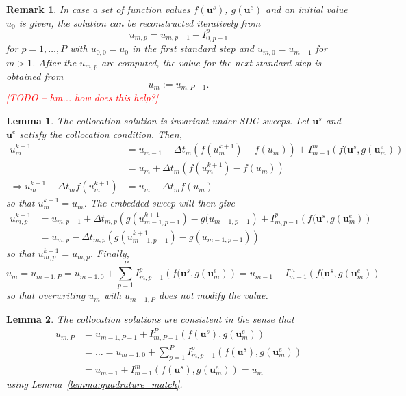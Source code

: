 \documentclass{article}
\newtheorem{remark}{Remark}
\newtheorem{lemma}{Lemma}
\newcommand{\ve}[1]{\mathbf{#1}}
\newcommand{\todo}[1]{\textcolor{red}{[TODO -- #1]}}
\begin{document}
%
%
%
\begin{remark}
In case a set of function values $f(\ve{u}^{s})$, $g(\ve{u}^e)$ and an initial value $u_0$ is given, the solution can be reconstructed iteratively from
\begin{equation}
	u_{m,p} = u_{m,p-1} + I_{0,p-1}^{p}
\end{equation}
for $p=1, \ldots, P$ with $u_{0,0} = u_0$ in the first standard step and $u_{m,0} = u_{m-1}$ for $m > 1$.
After the $u_{m,p}$ are computed, the value for the next standard step is obtained from
\begin{equation}
	u_{m} := u_{m,P-1}.
\end{equation}
\todo{hm... how does this help?}
\end{remark}
%
%
%
\begin{lemma}
The collocation solution is invariant under SDC sweeps. Let $\ve{u}^s$ and $\ve{u}^e$ satisfy the collocation condition.
Then,
\begin{align*}
	u^{k+1}_{m} &= u_{m-1}  + \Delta t_m \left( f(u^{k+1}_m) - f(u_m) \right) + I_{m-1}^{m}\left( f(\ve{u}^s, g(\ve{u}^e_m) \right) \\
		&= u_{m} + \Delta t_{m} \left( f(u^{k+1}_m) - f(u_m) \right) \\
	\Rightarrow u^{k+1}_m - \Delta t_m f(u^{k+1}_{m}) &= u_{m} - \Delta t_{m} f(u_m)
\end{align*}
so that $u^{k+1}_m = u_m$.
The embedded sweep will then give
\begin{align*}
	u^{k+1}_{m,p} &= u_{m,p-1} + \Delta t_{m,p} \left( g(u^{k+1}_{m-1,p-1}) - g(u_{m-1,p-1} \right) + I_{m,p-1}^{p} \left( f(\ve{u}^s, g(\ve{u}^e_m) \right) \\
				&= u_{m,p} - \Delta t_{m,p} \left( g(u^{k+1}_{m-1,p-1}) - g(u_{m-1,p-1}) \right)
\end{align*}
so that $u^{k+1}_{m,p} = u_{m,p}$.
Finally,
\begin{equation}
	u_{m} = u_{m-1,P} = u_{m-1,0} + \sum_{p=1}^{P} I_{m,p-1}^{p}\left( f(\ve{u}^s, g(\ve{u}^e_m) \right) = u_{m-1} + I_{m-1}^{m}\left( f(\ve{u}^s, g(\ve{u}^e_m) \right) 
\end{equation}
so that overwriting $u_{m}$ with $u_{m-1,P}$ does not modify the value.
\end{lemma}
%
%
%
\begin{lemma}
The collocation solutions are consistent in the sense that
\begin{align*}
	u_{m,P} &= u_{m-1,P-1} + I_{m,P-1}^{P}\left( f(\ve{u}^{s}) , g(\ve{u}^{e}_m) \right) \\
			&= \ldots = u_{m-1,0} + \sum_{p=1}^{P} I_{m,p-1}^{p}\left( f(\ve{u}^{s}) , g(\ve{u}^{e}_m) \right) \\
			&= u_{m-1} + I_{m-1}^{m}\left( f(\ve{u}^{s}) , g(\ve{u}^{e}_m) \right) = u_{m}
\end{align*}
using Lemma~\ref{lemma:quadrature_match}.
\end{lemma}
\end{document}

